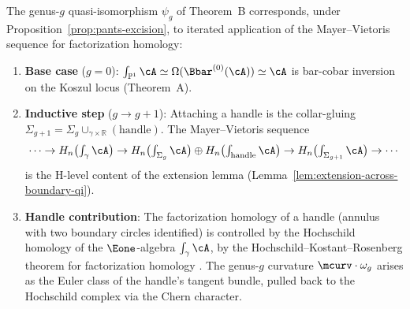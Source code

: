 \begin{proposition}
\label{prop:genus-induction-excision}
The genus-$g$ quasi-isomorphism $\psi_g$ of
Theorem~\textup{B} corresponds, under
Proposition~\textup{\ref{prop:pants-excision}}, to iterated
application of the Mayer--Vietoris sequence for factorization
homology:
\begin{enumerate}[label=(\roman*)]
\item \textbf{Base case} ($g = 0$):
$\int_{\mathbb{P}^1}\cA \simeq \Omega(\Bbar^{(0)}(\cA))
\simeq \cA$ is bar-cobar inversion on the Koszul locus
(Theorem~\textup{A}).

\item \textbf{Inductive step} ($g \to g+1$):
Attaching a handle is the collar-gluing
$\Sigma_{g+1} = \Sigma_g \cup_{\gamma \times \mathbb{R}}
(\text{handle})$. The Mayer--Vietoris sequence
\[
\cdots \to
H_n\bigl(\textstyle\int_\gamma\cA\bigr) \to
H_n\bigl(\textstyle\int_{\Sigma_g}\cA\bigr) \oplus
H_n\bigl(\textstyle\int_{\mathrm{handle}}\cA\bigr) \to
H_n\bigl(\textstyle\int_{\Sigma_{g+1}}\cA\bigr)
\to \cdots
\]
is the H-level content of the extension lemma
(Lemma~\textup{\ref{lem:extension-across-boundary-qi}}).

\item \textbf{Handle contribution}: The factorization homology
of a handle (annulus with two boundary circles identified) is
controlled by the Hochschild homology of the $\Eone$-algebra
$\int_\gamma\cA$, by the Hochschild--Kostant--Rosenberg
theorem for factorization homology
\cite[Theorem~5.5.3.10]{HA}.
The genus-$g$ curvature
$\mcurv \cdot \omega_g$ arises as the Euler class of the handle's
tangent bundle, pulled back to the Hochschild complex
via the Chern character.
\end{enumerate}
\end{proposition}

